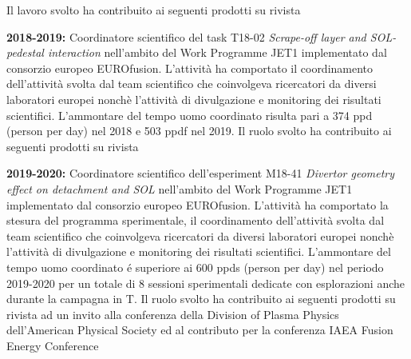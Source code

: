 \begin{enumerate}[label={[E\arabic*]}]
  Il lavoro svolto ha contribuito ai seguenti
  prodotti 
  su rivista \cite{agostini:ppcf2019, vianello:nf2019}
%
\item \textbf{2018-2019:} Coordinatore scientifico del task T18-02
  \emph{Scrape-off layer and SOL- pedestal interaction } nell'ambito
  del Work Programme JET1 implementato dal consorzio europeo
  EUROfusion. L'attivit{\`a} ha comportato il coordinamento
  dell'attivit{\`a} svolta dal team scientifico che coinvolgeva
  ricercatori da diversi laboratori europei nonch{\`e} l'attivit{\`a}
  di divulgazione e monitoring dei risultati scientifici. L'ammontare
  del tempo uomo coordinato risulta pari a 374 ppd (person per day)
  nel 2018 e 503 ppdf nel 2019. Il ruolo svolto ha contribuito ai
  seguenti prodotti su rivista \cite{tamain:nme2021, tecxy:nme2021}
%
\item \textbf{2019-2020:} Coordinatore scientifico dell'esperiment
  M18-41 \emph{Divertor geometry effect on detachment and SOL }
  nell'ambito del Work Programme JET1 implementato dal consorzio
  europeo EUROfusion. L'attivit{\`a} ha comportato la stesura del
  programma sperimentale, il coordinamento dell'attivit{\`a} svolta
  dal team scientifico che coinvolgeva ricercatori da diversi
  laboratori europei nonch{\`e} l'attivit{\`a} di divulgazione e
  monitoring dei risultati scientifici. L'ammontare del tempo uomo
  coordinato \'e superiore ai 600 ppds (person per day) nel periodo
  2019-2020 per un totale di 8 sessioni sperimentali dedicate con
  esplorazioni anche durante la campagna in T.
  Il ruolo svolto ha
  contribuito ai seguenti prodotti su rivista \cite{Lomanowski2023,lomanowski:nf2022} ad un invito alla conferenza della Division of
  Plasma Physics dell'American Physical Society
  \cite{lomanowski:aps2022separatrix} ed al contributo per la
  conferenza IAEA Fusion Energy Conference \cite{vianello:iaea2021sol}
 

\end{enumerate}
